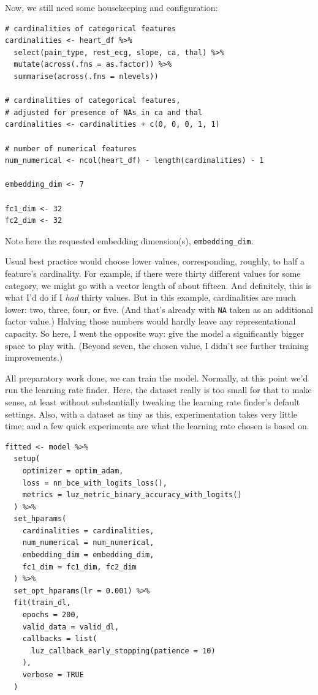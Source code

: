 \documentclass[
  letterpaper,
]{krantz}
\begin{document}
Now, we still need some housekeeping and configuration:

\begin{verbatim}
# cardinalities of categorical features
cardinalities <- heart_df %>%
  select(pain_type, rest_ecg, slope, ca, thal) %>%
  mutate(across(.fns = as.factor)) %>%
  summarise(across(.fns = nlevels))

# cardinalities of categorical features,
# adjusted for presence of NAs in ca and thal
cardinalities <- cardinalities + c(0, 0, 0, 1, 1) 

# number of numerical features
num_numerical <- ncol(heart_df) - length(cardinalities) - 1

embedding_dim <- 7

fc1_dim <- 32
fc2_dim <- 32
\end{verbatim}

Note here the requested embedding dimension(s), \texttt{embedding\_dim}.

Usual best practice would choose lower values, corresponding, roughly,
to half a feature's cardinality. For example, if there were thirty
different values for some category, we might go with a vector length of
about fifteen. And definitely, this is what I'd do if I \emph{had}
thirty values. But in this example, cardinalities are much lower: two,
three, four, or five. (And that's already with \texttt{NA} taken as an
additional factor value.) Halving those numbers would hardly leave any
representational capacity. So here, I went the opposite way: give the
model a significantly bigger space to play with. (Beyond seven, the
chosen value, I didn't see further training improvements.)

All preparatory work done, we can train the model. Normally, at this
point we'd run the learning rate finder. Here, the dataset really is too
small for that to make sense, at least without substantially tweaking
the learning rate finder's default settings. Also, with a dataset as
tiny as this, experimentation takes very little time; and a few quick
experiments are what the learning rate chosen is based on.

\begin{verbatim}
fitted <- model %>%
  setup(
    optimizer = optim_adam,
    loss = nn_bce_with_logits_loss(),
    metrics = luz_metric_binary_accuracy_with_logits()
  ) %>%
  set_hparams(
    cardinalities = cardinalities,
    num_numerical = num_numerical,
    embedding_dim = embedding_dim,
    fc1_dim = fc1_dim, fc2_dim
  ) %>%
  set_opt_hparams(lr = 0.001) %>%
  fit(train_dl,
    epochs = 200,
    valid_data = valid_dl,
    callbacks = list(
      luz_callback_early_stopping(patience = 10)
    ),
    verbose = TRUE
  )
\end{verbatim}
\end{document}
